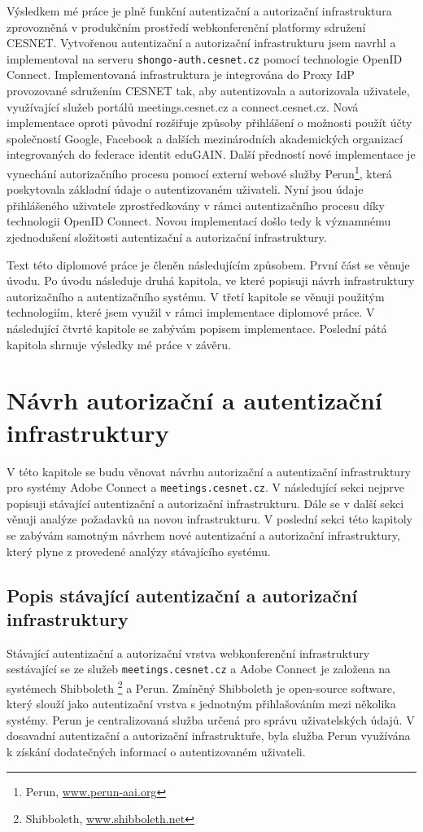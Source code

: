 \documentclass[
  printed, %
  twoside, %
  table,   %
  nolof,     %
  nolot,     %
]{fithesis3}
\begin{document}
Výsledkem mé práce je plně funkční autentizační a autorizační infrastruktura zprovozněná v produkčním prostředí webkonferenční platformy sdružení CESNET. Vytvořenou autentizační a autorizační infrastrukturu jsem navrhl a implementoval na serveru \texttt{shongo-auth.cesnet.cz} pomocí technologie OpenID Connect. Implementovaná infrastruktura je integrována do Proxy IdP provozované sdružením CESNET tak, aby autentizovala a autorizovala uživatele, využívající služeb portálů meetings.cesnet.cz a connect.cesnet.cz. Nová implementace oproti původní rozšiřuje způsoby přihlášení o možnosti použít účty společností Google, Facebook a dalších mezinárodních akademických organizací integrovaných do federace identit eduGAIN. Další předností nové implementace je vynechání autorizačního procesu pomocí externí webové služby Perun\footnote{Perun, \url{www.perun-aai.org}}, která poskytovala základní údaje o autentizovaném uživateli. Nyní jsou údaje přihlášeného uživatele zprostředkovány v rámci autentizačního procesu díky technologii OpenID Connect. Novou implementací došlo tedy k významnému zjednodušení složitosti autentizační a autorizační infrastruktury. \par

Text této diplomové práce je členěn následujícím způsobem. První část se věnuje úvodu. Po úvodu následuje druhá kapitola, ve které popisuji návrh infrastruktury autorizačního a autentizačního systému. V třetí kapitole se věnuji použitým technologiím, které jsem využil v rámci implementace diplomové práce. V následující čtvrté kapitole se zabývám popisem implementace. Poslední pátá kapitola shrnuje výsledky mé práce v závěru. 

\chapter{Návrh autorizační a autentizační infrastruktury}
V této kapitole se budu věnovat návrhu autorizační a autentizační infrastruktury pro systémy Adobe Connect a \texttt{meetings.cesnet.cz}. V následující sekci nejprve popisuji stávající autentizační a autorizační infrastrukturu. Dále se v další sekci věnuji analýze požadavků na novou infrastrukturu. V poslední sekci této kapitoly se zabývám samotným návrhem nové autentizační a autorizační infrastruktury, který plyne z provedené analýzy stávajícího systému.    

\section{Popis stávající autentizační a autorizační infrastruktury}
Stávající autentizační a autorizační vrstva webkonferenční infrastruktury sestávající se ze služeb \texttt{meetings.cesnet.cz} a Adobe Connect je založena na systémech Shibboleth \footnote{Shibboleth, \url{www.shibboleth.net}} a Perun. Zmíněný Shibboleth je open-source software, který slouží jako autentizační vrstva s jednotným přihlašováním mezi několika systémy. Perun \cite{perunPresentation} je centralizovaná služba určená pro správu uživatelských údajů. V dosavadní autentizační a autorizační infrastruktuře, byla služba Perun využívána k získání dodatečných informací o autentizovaném uživateli. \par
\end{document}
